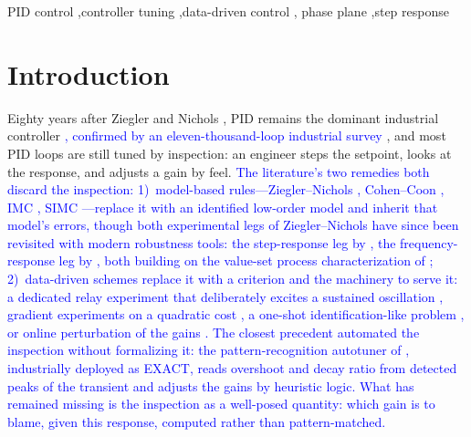 \documentclass[final,3p,times,twocolumn]{elsarticle}
\newcommand{\reve}[1]{\textcolor{blue}{#1}} %
\newcommand{\revf}[1]{\textcolor{blue}{#1}} %
\newcommand{\revh}[1]{\textcolor{blue}{#1}} %
\begin{document}
\begin{frontmatter}
\begin{keyword}
PID control \sep controller tuning \sep data-driven control \sep
phase plane \sep step response
\end{keyword}

\end{frontmatter}

\section{Introduction}

Eighty years after Ziegler and Nichols \cite{ZN1942}, PID remains the
dominant industrial controller \cite{AstromHagglund2001}\revf{,
confirmed by an eleven-thousand-loop industrial survey
\cite{Desborough2002}}, and most PID
loops are still tuned by inspection: an engineer steps the setpoint,
looks at the response, and adjusts a gain by feel. \reve{The literature's two remedies both discard the inspection:
1)~model-based rules---Ziegler--Nichols \cite{ZN1942}, Cohen--Coon
\cite{CohenCoon1953}, IMC \cite{RiveraIMC}, SIMC
\cite{Skogestad2003}---replace it with an identified low-order model
and inherit that model's errors, though both experimental legs of
Ziegler--Nichols have since been revisited with modern robustness
tools\revf{: the step-response leg by \cite{AstromHagglund2004}, the
frequency-response leg by \cite{Schlegel2002}, both building on the
value-set process characterization of \cite{SchlegelCech2005}};
2)~data-driven schemes replace it with a criterion and the machinery
to serve it: a dedicated relay experiment that deliberately excites a
sustained oscillation \cite{AstromHagglund1984}, gradient experiments
on a quadratic cost \cite{HjalmarssonIFT}, a one-shot
identification-like problem \cite{CampiVRFT}, or online perturbation
of the gains \cite{KillingsworthKrstic}. \revh{The closest precedent
automated the inspection without formalizing it: the
pattern-recognition autotuner of \cite{KrausMyron1984}, industrially
deployed as EXACT, reads overshoot and decay ratio from detected peaks
of the transient and adjusts the gains by heuristic logic. What has
remained missing is the inspection as a well-posed quantity: which
gain is to blame, given this response, computed rather than
pattern-matched.}}
\end{document}
